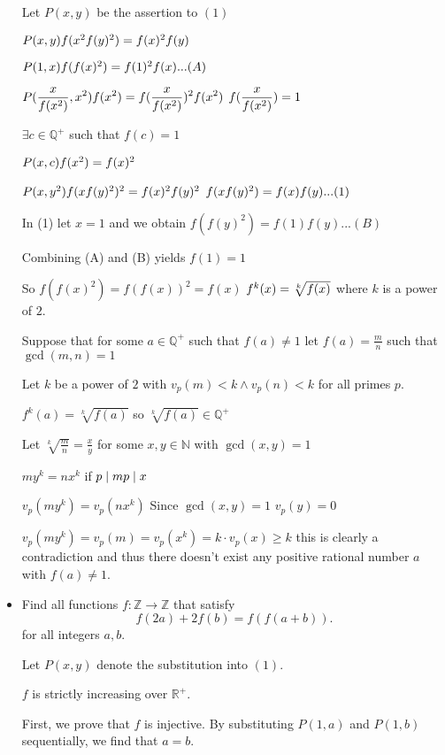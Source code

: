 \documentclass[11pt]{scrartcl}
\begin{document}
\begin{itemize}[label=, leftmargin=0em, itemsep=0.2em]
\begin{sol}
    Let $P(x,y)$ be the assertion to $(1)$

    $P(x,y) \ra f(x^{2}f(y)^2)=f(x)^{2}f(y) $

    $P(1,x) \ra f(f(x)^2)=f(1)^{2}f(x)...(A)$

    $P(\displaystyle \frac{x}{f(x^2)},x^2) \ra f(x^2)=f(\frac{x}{f(x^2)})^{2}f(x^2)$ $\ra  f(\displaystyle \frac{x}{f(x^2)})=1$

    $\exists c\in \mathbb{Q^+}$ such that $f(c)=1$

    $P(x,c) \ra f(x^2)=f(x)^2$

    $P(x,y^2) \ra f(xf(y)^2)^2=f(x)^{2}f(y)^{2}$ $\ra f(xf(y)^2)=f(x)f(y) ... (1)$

    In (1) let $x=1$ and we obtain $f(f(y)^2)=f(1)f(y)...(B)$

    Combining (A) and (B) yields $f(1)=1$

    So $f(f(x)^2)= f(f(x))^2= f(x)$ $\ra f^k(x)=\sqrt[k]{f(x)}$ where $k$ is a power of $2$.

    Suppose that for some $a\in \mathbb{Q^+}$ such that $f(a)\neq 1$ let $f(a)=\displaystyle \frac{m}{n}$ such that $\gcd(m,n)=1$

    Let $k$ be a power of $2$ with $v_{p}(m)<k \wedge v_{p}(n)<k$ for all primes $p$.

    $f^k(a)=\sqrt[k]{f(a)}$ so $\sqrt[k]{f(a)} \in \mathbb{Q^+}$

    Let $\sqrt[k]{\displaystyle\frac{m}{n}}=\displaystyle\frac{x}{y}$ for some $x,y \in \mathbb{N}$ with $\gcd(x,y)=1$

    $my^k=nx^k$ if $p \mid m \ra p \mid x$

    $v_{p}(my^k)=v_{p}(nx^k)$ Since $\gcd(x,y)=1$ $v_{p}(y)=0$

    $v_{p}(my^k)=v_{p}(m)=v_{p}(x^k)=k \cdot v_{p}(x) \geq k$ this is clearly a contradiction and thus there doesn't exist any positive rational number $a$ with $f(a)\neq 1$.
    \end{sol}

    \item \begin{bt}
        Find all functions $f: \mathbb{Z} \to \mathbb{Z}$ that satisfy
        $$f(2a)+2f(b)=f(f(a+b)).$$
        for all integers  $a,b$.
    \end{bt}
    \begin{sol}
        Let $P(x,y)$ denote the substitution into $(1)$.

 $f$ is strictly increasing over $\mathbb{R}^+$.
\begin{pro}
    First, we prove that $f$ is injective. By substituting $P(1,a)$ and $P(1,b)$ sequentially, we find that $a = b$.


\end{pro}
\end{sol}
\end{itemize}
\end{document}

